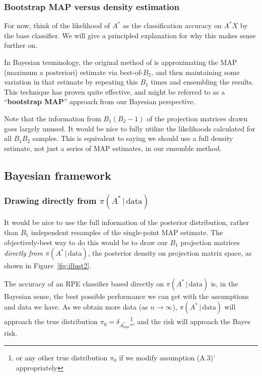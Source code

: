 \documentclass{amsart}
\begin{document}
\subsubsection{Bootstrap MAP versus density estimation}

For now, think of the likelihood of $A^*$ as the classification accuracy on $A^*X$ by the base classifier. We will give a principled explanation for why this makes sense further on.

In Bayesian terminology, the original method of \cite{CS15} is approximating the MAP (maximum a posteriori) estimate via best-of-$B_2$, and then maintaining some variation in that estimate by repeating this $B_1$ times and ensembling the results. This technique has proven quite effective, and might be referred to as a ``\textbf{bootstrap MAP}'' approach from our Bayesian perspective.

Note that the information from $B_1(B_2-1)$ of the projection matrices drawn goes largely unused. It would be nice to fully utilize the likelihoods calculated for all $B_1B_2$ samples. This is equivalent to saying we should use a full density estimate, not just a series of MAP estimates, in our ensemble method.

\subsection{Bayesian framework}

\subsubsection{Drawing directly from $\pi(A^*\,|\,\mathrm{data})$}

It would be nice to use the full information of the posterior distribution, rather than $B_1$ independent resamples of the single-point MAP estimate. The objectively-best way to do this would be to draw our $B_1$ projection matrices \emph{directly from $\pi(A^*\,|\,\mathrm{data})$}, the posterior density on projection matrix space, as shown in Figure~\ref{fig:illust2}.

The accuracy of an RPE classifier based directly on $\pi(A^*\,|\,\mathrm{data})$ is, in the Bayesian sense, the best possible performance we can get with the assumptions and data we have. As we obtain more data (as $n\to\infty$), $\pi(A^*\,|\,\mathrm{data})$ will approach the true distribution $\pi_0 = \delta_{A^*_\mathrm{true}}$\footnote{or any other true distribution $\pi_0$ if we modify assumption (A.3)' appropriately}, and the risk will approach the Bayes risk.
\end{document}
